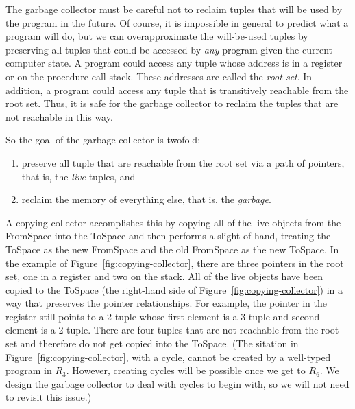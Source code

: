 \documentclass[11pt]{book}
\begin{document}
The garbage collector must be careful not to reclaim tuples that will
be used by the program in the future. Of course, it is impossible in
general to predict what a program will do, but we can overapproximate
the will-be-used tuples by preserving all tuples that could be
accessed by \emph{any} program given the current computer state.  A
program could access any tuple whose address is in a register or on
the procedure call stack. These addresses are called the \emph{root
  set}. In addition, a program could access any tuple that is
transitively reachable from the root set. Thus, it is safe for the
garbage collector to reclaim the tuples that are not reachable in this
way.

So the goal of the garbage collector is twofold:
\begin{enumerate}
\item preserve all tuple that are reachable from the root set via a
  path of pointers, that is, the \emph{live} tuples, and
\item reclaim the memory of everything else, that is, the
  \emph{garbage}.
\end{enumerate}
A copying collector accomplishes this by copying all of the live
objects from the FromSpace into the ToSpace and then performs a slight
of hand, treating the ToSpace as the new FromSpace and the old
FromSpace as the new ToSpace.  In the example of
Figure~\ref{fig:copying-collector}, there are three pointers in the
root set, one in a register and two on the stack.  All of the live
objects have been copied to the ToSpace (the right-hand side of
Figure~\ref{fig:copying-collector}) in a way that preserves the
pointer relationships. For example, the pointer in the register still
points to a 2-tuple whose first element is a 3-tuple and second
element is a 2-tuple.  There are four tuples that are not reachable
from the root set and therefore do not get copied into the ToSpace.
(The sitation in Figure~\ref{fig:copying-collector}, with a
cycle, cannot be created by a well-typed program in $R_3$. However,
creating cycles will be possible once we get to $R_6$.  We design
the garbage collector to deal with cycles to begin with, so we will
not need to revisit this issue.)
\end{document}

